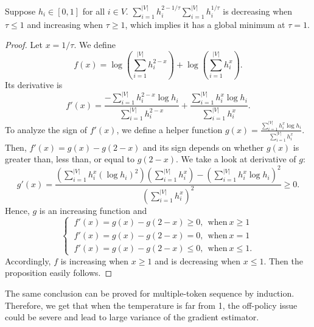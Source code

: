 \begin{proposition}
Suppose $h_i\in[0,1]$ for all $i\in V$.
$\sum_{i=1}^{|V|} h_i^{2-1/\tau}\sum_{i=1}^{|V|} h^{1/\tau}_i$ is decreasing when $\tau\le1$ and increasing when $\tau\ge1$, which implies it has a global minimum at $\tau=1$.
\end{proposition}
\begin{proof}
Let $x=1/\tau$. We define 
\[
f(x)=\log\left(\sum_{i=1}^{|V|} h_i^{2-x}\right)+\log\left(\sum_{i=1}^{|V|} h^{x}_i\right).
\]
Its derivative is
\[
f'(x)=\frac{-\sum_{i=1}^{|V|} h_i^{2-x}\log h_i}{\sum_{i=1}^{|V|} h_i^{2-x}}
+\frac{\sum_{i=1}^{|V|} h_i^{x}\log h_i}{\sum_{i=1}^{|V|} h_i^{x}}.
\]
To analyze the sign of $f'(x)$, we define a helper function $g(x) = \frac{\sum_{i=1}^{|V|} h_i^{x}\log h_i}{\sum_{i=1}^{|V|} h_i^{x}}$. Then, $f'(x)=g(x)-g(2-x)$ and its sign depends on whether $g(x)$ is greater than, less than, or equal to $g(2-x)$. We take a look at derivative of $g$:
\[
g'(x) = \frac{\left(\sum_{i=1}^{|V|} h_i^{x}(\log h_i)^2\right) \left(\sum_{i=1}^{|V|} h_i^{x}\right) - \left(\sum_{i=1}^{|V|} h_i^{x}\log h_i\right)^2}{\left(\sum_{i=1}^{|V|} h_i^{x}\right)^2}\ge0.
\]
Hence, $g$ is an increasing function and
\begin{equation*}
\begin{cases}
~f'(x)=g(x)-g(2-x)\ge0,~~\mathrm{when}~x\ge1\\
~f'(x)=g(x)-g(2-x)=0,~~\mathrm{when}~x=1\\
~f'(x)=g(x)-g(2-x)\le0,~~\mathrm{when}~x\le1.
\end{cases}
\end{equation*}
Accordingly, $f$ is increasing when $x\ge1$ and is decreasing when $x\le1$. Then the proposition easily follows.
\end{proof}

The same conclusion can be proved for multiple-token sequence by induction. Therefore, we get that
when the temperature is far from 1, the off-policy issue could be severe and lead to large variance of the gradient estimator. 


